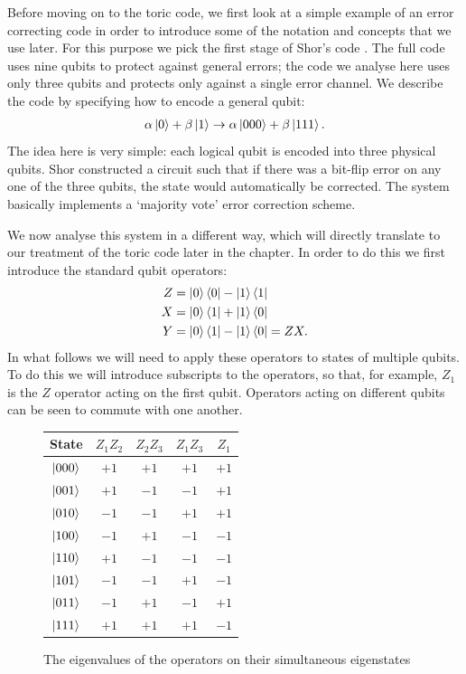 Before moving on to the toric code, we first look at a simple example of an error correcting code in order to introduce some of the notation and concepts that we use later. For this purpose we pick the first stage of Shor's code \cite{shor_codes_95}. The full code uses nine qubits to protect against general errors; the code we analyse here uses only three qubits and protects only against a single error channel. We describe the code by specifying how to encode a general qubit:
\begin{align}\label{shor_state}
  \alpha\left\vert0\right\rangle + \beta\left\vert1\right\rangle \rightarrow \alpha\left\vert000\right\rangle + \beta\left\vert111\right\rangle.
\end{align}
The idea here is very simple: each logical qubit is encoded into three physical qubits. Shor constructed a circuit such that if there was a bit-flip error on any one of the three qubits, the state would automatically be corrected. The system basically implements a `majority vote' error correction scheme.

We now analyse this system in a different way, which will directly translate to our treatment of the toric code later in the chapter. In order to do this we first introduce the standard qubit operators:
\begin{align}
  Z &= \left\vert0\right\rangle\left\langle 0\right\vert - \left\vert1\right\rangle\left\langle 1\right\vert \\
  X &= \left\vert0\right\rangle\left\langle 1\right\vert + \left\vert1\right\rangle\left\langle 0\right\vert \\
  Y &= \left\vert0\right\rangle\left\langle 1\right\vert - \left\vert1\right\rangle\left\langle 0\right\vert = ZX.
\end{align}
In what follows we will need to apply these operators to states of multiple qubits. To do this we will introduce subscripts to the operators, so that, for example, $Z_1$ is the $Z$ operator acting on the first qubit. Operators acting on different qubits can be seen to commute with one another.

\begin{figure}\label{ops_states}
  \begin{center}
    \begin{tabular}{c c c c c}
      State & $Z_1 Z_2$ & $Z_2 Z_3$ & $Z_1 Z_3$ & $Z_1$ \\
      \hline
      $\left\vert000\right\rangle$ & $+1$ & $+1$ & $+1$ & $+1$ \\
      $\left\vert001\right\rangle$ & $+1$ & $-1$ & $-1$ & $+1$ \\
      $\left\vert010\right\rangle$ & $-1$ & $-1$ & $+1$ & $+1$ \\
      $\left\vert100\right\rangle$ & $-1$ & $+1$ & $-1$ & $-1$ \\
      $\left\vert110\right\rangle$ & $+1$ & $-1$ & $-1$ & $-1$ \\
      $\left\vert101\right\rangle$ & $-1$ & $-1$ & $+1$ & $-1$ \\
      $\left\vert011\right\rangle$ & $-1$ & $+1$ & $-1$ & $+1$ \\
      $\left\vert111\right\rangle$ & $+1$ & $+1$ & $+1$ & $-1$
    \end{tabular}
  \end{center}
  \caption{The eigenvalues of the operators on their simultaneous eigenstates}
\end{figure}

